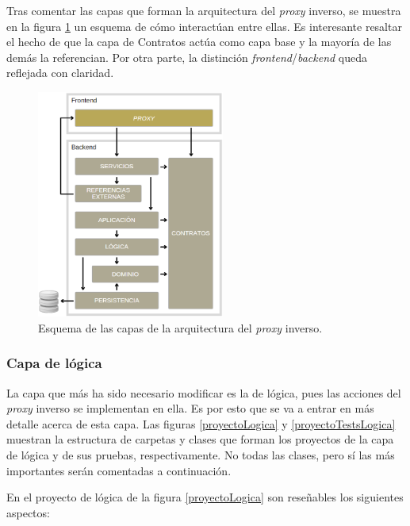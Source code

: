 \documentclass[11pt,spanish,listoffigures]{tfgetsinf}
\begin{document}
Tras comentar las capas que forman la arquitectura del \emph{proxy} inverso, se muestra en la figura \ref{arquitectura} un esquema de cómo interactúan entre ellas. Es interesante resaltar el hecho de que la capa de Contratos actúa como capa base y la mayoría de las demás la referencian. Por otra parte, la distinción \emph{frontend}/\emph{backend} queda reflejada con claridad.

\begin{figure}[ht]
\centering
\includegraphics[width=0.55\textwidth]{imagenes/arquitectura}
\caption{Esquema de las capas de la arquitectura del \emph{proxy} inverso.}
	\label{arquitectura}
\end{figure}

\newpage %


			\subsubsection{Capa de lógica}

La capa que más ha sido necesario modificar es la de lógica, pues las acciones del \emph{proxy} inverso se implementan en ella. Es por esto que se va a entrar en más detalle acerca de esta capa. Las figuras \ref{proyectoLogica} y \ref{proyectoTestsLogica} muestran la estructura de carpetas y clases que forman los proyectos de la capa de lógica y de sus pruebas, respectivamente. No todas las clases, pero sí las más importantes serán comentadas a continuación.

En el proyecto de lógica de la figura \ref{proyectoLogica} son reseñables los siguientes aspectos:
\end{document}
